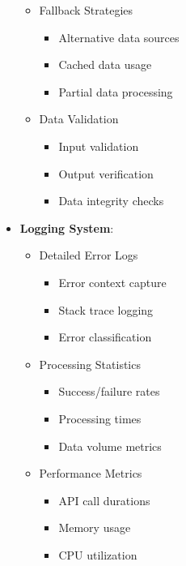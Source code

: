 \documentclass[12pt]{article}
\begin{document}
\begin{itemize}
\begin{itemize}
        \item Fallback Strategies
        \begin{itemize}
            \item Alternative data sources
            \item Cached data usage
            \item Partial data processing
        \end{itemize}
        
        \item Data Validation
        \begin{itemize}
            \item Input validation
            \item Output verification
            \item Data integrity checks
        \end{itemize}
    \end{itemize}
    
    \item \textbf{Logging System}:
    \begin{itemize}
        \item Detailed Error Logs
        \begin{itemize}
            \item Error context capture
            \item Stack trace logging
            \item Error classification
        \end{itemize}
        
        \item Processing Statistics
        \begin{itemize}
            \item Success/failure rates
            \item Processing times
            \item Data volume metrics
        \end{itemize}
        
        \item Performance Metrics
        \begin{itemize}
            \item API call durations
            \item Memory usage
            \item CPU utilization
        \end{itemize}
    \end{itemize}
\end{itemize}
\end{document}
